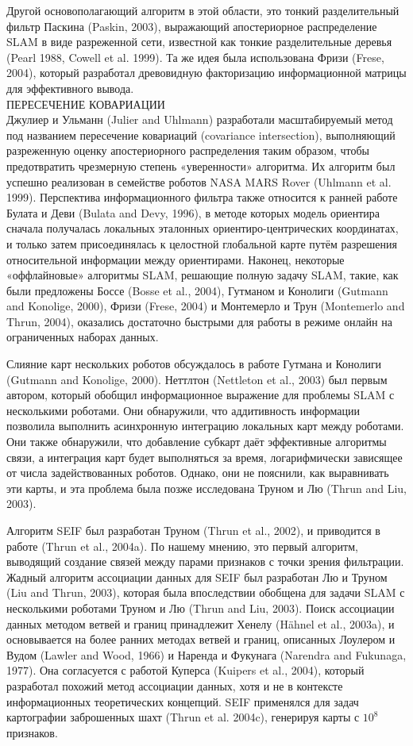 \documentclass[10pt,a4paper]{article}
\begin{document}
Другой основополагающий алгоритм в этой области, это тонкий разделительный фильтр Паскина (Paskin, 2003), выражающий апостериорное распределение SLAM в виде разреженной сети, известной как тонкие разделительные деревья (Pearl 1988, Cowell et al. 1999). Та же идея была использована Фризи (Frese, 2004), который разработал древовидную факторизацию информационной матрицы для эффективного вывода.\\
ПЕРЕСЕЧЕНИЕ КОВАРИАЦИИ\\
Джулиер и Ульманн (Julier and Uhlmann) разработали масштабируемый метод под названием пересечение ковариаций (covariance intersection), выполняющий разреженную оценку апостериорного распределения таким образом, чтобы предотвратить чрезмерную степень «уверенности» алгоритма.
Их алгоритм был успешно реализован в семействе роботов NASA MARS Rover (Uhlmann et al. 1999). Перспектива информационного фильтра также относится к ранней работе Булата и Деви (Bulata and Devy, 1996), в методе которых модель ориентира сначала получалась локальных эталонных ориентиро-центрических координатах, и только затем присоединялась к целостной глобальной карте путём разрешения относительной информации между ориентирами. Наконец, некоторые «оффлайновые» алгоритмы SLAM, решающие полную задачу SLAM, такие, как были предложены Боссе (Bosse et al., 2004), Гутманом и Конолиги (Gutmann and Konolige, 2000), Фризи (Frese, 2004) и Монтемерло и Трун (Montemerlo and Thrun, 2004), оказались достаточно быстрыми для работы в режиме онлайн на ограниченных наборах данных.

Слияние карт нескольких роботов обсуждалось в работе Гутмана и Конолиги (Gutmann and Konolige, 2000). Неттлтон (Nettleton et al., 2003) был первым автором, который обобщил информационное выражение для проблемы SLAM с несколькими роботами. Они обнаружили, что аддитивность информации позволила выполнить асинхронную интеграцию локальных карт между роботами. Они также обнаружили, что добавление субкарт даёт эффективные алгоритмы связи, а интеграция карт будет выполняться за время, логарифмически зависящее от числа задействованных роботов. Однако, они не пояснили, как выравнивать эти карты, и эта проблема была позже исследована Труном и Лю (Thrun and Liu,  2003).

Алгоритм SEIF был разработан Труном (Thrun et al., 2002), и приводится в работе (Thrun et al., 2004a). По нашему мнению, это первый алгоритм, выводящий создание связей между парами признаков с точки зрения фильтрации. Жадный алгоритм ассоциации данных для SEIF был разработан Лю и Труном (Liu and Thrun, 2003), которая была впоследствии обобщена для задачи SLAM с несколькими роботами Труном и Лю (Thrun and Liu, 2003). Поиск ассоциации данных методом ветвей и границ принадлежит Хенелу (Hähnel et al., 2003a), и основывается на более ранних методах ветвей и границ, описанных Лоулером и Вудом (Lawler and Wood, 1966) и Наренда и Фукунага (Narendra and Fukunaga, 1977). Она согласуется с работой Куперса (Kuipers et al., 2004), который разработал похожий метод ассоциации данных, хотя и не в контексте информационных теоретических концепций. SEIF применялся для задач картографии заброшенных шахт (Thrun et al. 2004c), генерируя карты с $10^8$ признаков.
\end{document}
